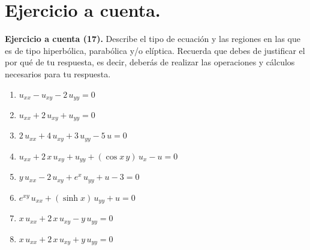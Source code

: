 \newpage

\section{Ejercicio a cuenta.}

\textbf{Ejercicio a cuenta (17).} Describe el tipo de ecuación y las regiones en las que es de tipo hiperbólica, parabólica y/o elíptica. Recuerda que debes de justificar el por qué de tu respuesta, es decir, deberás de realizar las operaciones y cálculos necesarios para tu respuesta.

\begin{enumerate}[label=\alph*)]
\item \Large{$u_{xx} - u_{xy} - 2 \, u_{yy} = 0$}
\item \Large{$u_{xx} + 2 \, u_{xy} + u_{yy} = 0$}
\item \Large{$2 \, u_{xx} + 4 \, u_{xy} + 3 \, u_{yy} - 5 \, u = 0$}
\item \Large{$u_{xx} + 2 \, x \, u_{xy} + u_{yy} + (\cos x \, y) \, u_{x} - u = 0$}
\item \Large{$y \, u_{xx} - 2 \, u_{xy} + e^{x} \, u_{yy} + u - 3 = 0$}
\item \Large{$e^{x y} \, u_{xx} + (\sinh x) \, u_{yy} + u = 0$}
\item \Large{$x \, u_{xx} + 2 \, x \, u_{xy} - y \, u_{yy} = 0$}
\item \Large{$x \, u_{xx} + 2 \, x \, u_{xy} + y \, u_{yy} = 0$}
\end{enumerate}

